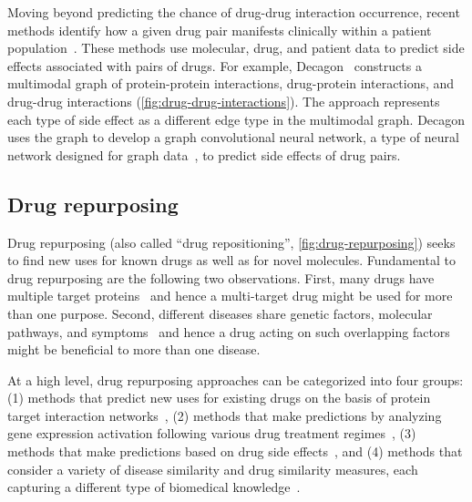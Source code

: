 \documentclass[5p]{elsarticle}
\newcommand{\rev}[1]{{\color{black}#1}}
\begin{document}
Moving beyond predicting the chance of drug-drug interaction occurrence, recent methods identify how \rev{a given drug} pair manifests clinically within a patient population~\cite{Zitnik2018polypharmacy,Ma2018drug,Ryu2018deep}.
These methods use molecular, drug, and patient data to predict side effects associated with pairs of drugs.
For example, Decagon~\cite{Zitnik2018polypharmacy} constructs a multimodal graph of protein-protein interactions, drug-protein interactions, and drug-drug interactions (\autoref{fig:drug-drug-interactions}).
The approach represents each type of side \rev{effect} as a different edge type in the multimodal graph.
Decagon uses the graph to develop a graph convolutional neural network, a type of neural network designed for graph data~\cite{Hamilton2017review}, \rev{to predict side effects} of drug pairs.

\subsection{Drug repurposing}

Drug repurposing (also called ``drug repositioning'', \autoref{fig:drug-repurposing}) \rev{seeks} to find new uses for known drugs as well as for novel molecules.
Fundamental to drug repurposing are the following two observations.
First, many drugs have multiple \rev{target proteins}~\cite{Guney2016network} and hence a multi-target drug might be used for more than one purpose.
Second, different diseases share genetic factors, molecular pathways, and \rev{symptoms}~\cite{Zitnik2013discovering,Menche2015} and hence a drug acting on such overlapping factors might be beneficial to more than one disease.

At a high level, drug repurposing approaches can be categorized into four groups: (1) methods that predict new uses for existing drugs on the basis of protein target interaction networks~\cite{Li2009building,Wu2013network,Cheng2012prediction,Zhao2012co,Luo2017network}, (2) methods that make predictions by analyzing gene expression activation following various drug treatment regimes~\cite{Sirota2011discovery,Stanfield2017drug}, (3) methods that make predictions based on drug side effects~\cite{Fung2013extracting,Zhang2013exploring,Kuhn2013systematic,Wang2014exploring}, and (4) methods that consider a variety of disease similarity and drug similarity measures, each capturing a different type of biomedical knowledge~\rev{\cite{Wang2014drug,Gottlieb2011predict,Zhang2013computational,Li2013pathway,Yu2017prediction,Luo2016drug,Himmelstein2017systematic}.}
\end{document}
